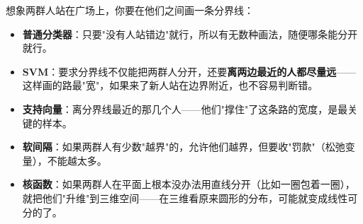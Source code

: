 \documentclass[a4paper,11pt]{ctexart}
\begin{document}
\begin{metaphorbox}
    想象两群人站在广场上，你要在他们之间画一条分界线：
    \begin{itemize}
        \item \textbf{普通分类器}：只要"没有人站错边"就行，所以有无数种画法，随便哪条能分开就行。
        \item \textbf{SVM}：要求分界线不仅能把两群人分开，还要\textbf{离两边最近的人都尽量远}——这样画的路最"宽"，如果来了新人站在边界附近，也不容易判断错。
        \item \textbf{支持向量}：离分界线最近的那几个人——他们"撑住"了这条路的宽度，是最关键的样本。
        \item \textbf{软间隔}：如果两群人有少数"越界"的，允许他们越界，但要收"罚款"（松弛变量），不能越太多。
        \item \textbf{核函数}：如果两群人在平面上根本没办法用直线分开（比如一圈包着一圈），就把他们"升维"到三维空间——在三维看原来圆形的分布，可能就变成线性可分的了。
    \end{itemize}
\end{metaphorbox}
\end{document}
